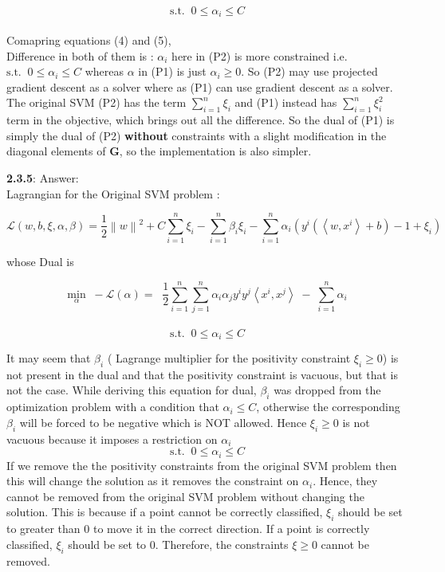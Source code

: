 \documentclass[a4paper,11pt]{article}
\begin{document}
\begin{mlsolution}
\[\text{s.t.} \;\;0 \leq \alpha_{i} \leq C\]\\

Comapring equations (4) and (5),\\

Difference in both of them is : $\alpha_{i}$ here in (P2) is more constrained i.e. $\text{s.t.} \;\;0 \leq \alpha_{i} \leq C$ whereas $\alpha$ in (P1) is just $\alpha_{i} \geq 0$. So (P2) may use projected gradient descent as a solver where as (P1) can use gradient descent as a solver.\\

The original SVM (P2) has the term $\sum_{i=1}^{n}\xi_{i}$ and (P1) instead has $\sum_{i=1}^{n}\xi_{i}^{2}$ term in the objective, which brings out all the difference. So the dual of (P1) is simply the dual of (P2) \textbf{without} constraints with a slight modification in the diagonal elements of \textbf{G}, so the implementation is also simpler. 
\newpage

\textbf{2.3.5}: Answer:\\

Lagrangian for the Original SVM problem : 

\[
\mathcal{L}\left ( w, b, \xi, \alpha, \beta \right ) =
\frac{1}{2} \left \| w \right \|^{2} + C \sum_{i=1}^{n} \xi_{i} - \sum_{i=1}^{n} \beta_{i}\xi_{i} - \sum_{i=1}^{n} \alpha_i\left ( y^{i}\left ( \left \langle w, x^{i} \right \rangle + b \right ) - 1 + \xi_{i} \right )
\]

whose Dual is 

\[
\underset{\alpha}{\text{min}} \;\; - \mathcal{L}\left ( \alpha \right ) = \; \;\frac{1}{2}\sum_{i=1}^{n}\sum_{j=1}^{n}\alpha_{i}\alpha_{j}y^{i}y^{j}\left \langle x^{i}, x^{j} \right \rangle \;-\; \sum_{i=1}^{n}\alpha_{i}
\]\\
\[\text{s.t.} \;\;0 \leq \alpha_{i} \leq C\]

It may seem that $\beta_{i}$ ( Lagrange multiplier for the positivity constraint $\xi_{i} \geq 0$) is not present in the dual and that the positivity constraint is vacuous, but that is not the case. While deriving this equation for dual, $\beta_{i}$ was dropped from the optimization problem with a condition that $\alpha_{i} \leq C$, otherwise the corresponding $\beta_{i}$ will be forced to be negative which is NOT allowed. Hence $\xi_{i} \geq 0$ is not vacuous because it imposes a restriction on $\alpha_{i}$ \; \[\text{s.t.} \;\;0 \leq \alpha_{i} \leq C\] If we remove the the positivity constraints from the original SVM problem then this will change the solution as it removes the constraint on $\alpha_{i}$. Hence, they cannot be removed from the original SVM problem without changing the solution. This is because if a point cannot be correctly classified, $\xi_{i}$ should be set to greater than 0 to move it in the correct direction. If a point is correctly classified, $\xi_{i}$ should be set to 0. Therefore, the constraints $\xi \geq 0$ cannot be removed.
 
\end{mlsolution}
\end{document}
